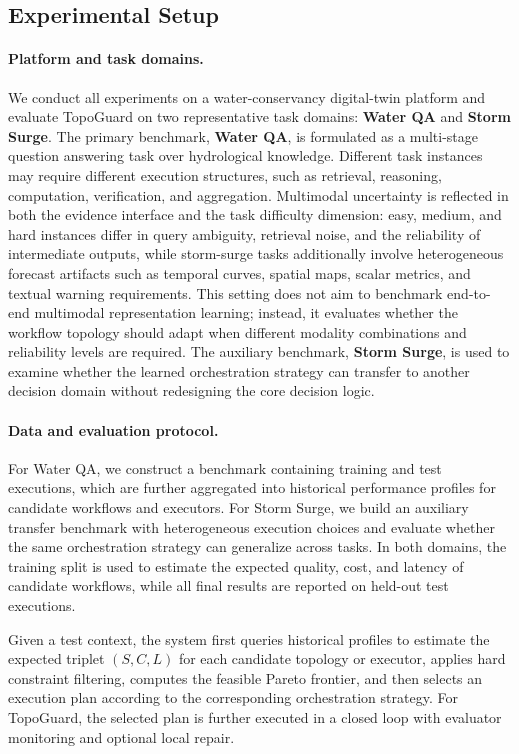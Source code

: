 \documentclass[manuscript,review,anonymous]{acmart}
\begin{document}
\subsection{Experimental Setup}
\label{subsec:exp_setup}



\paragraph{Platform and task domains.}
We conduct all experiments on a water-conservancy digital-twin platform and evaluate TopoGuard on two representative task domains: \textbf{Water QA} and \textbf{Storm Surge}. 
The primary benchmark, \textbf{Water QA}, is formulated as a multi-stage question answering task over hydrological knowledge. 
Different task instances may require different execution structures, such as retrieval, reasoning, computation, verification, and aggregation. 
Multimodal uncertainty is reflected in both the evidence interface and the task difficulty dimension: easy, medium, and hard instances differ in query ambiguity, retrieval noise, and the reliability of intermediate outputs, while storm-surge tasks additionally involve heterogeneous forecast artifacts such as temporal curves, spatial maps, scalar metrics, and textual warning requirements. This setting does not aim to benchmark end-to-end multimodal representation learning; instead, it evaluates whether the workflow topology should adapt when different modality combinations and reliability levels are required. The auxiliary benchmark, \textbf{Storm Surge}, is used to examine whether the learned orchestration strategy can transfer to another decision domain without redesigning the core decision logic.


\paragraph{Data and evaluation protocol.}
For Water QA, we construct a benchmark containing training and test executions, which are further aggregated into historical performance profiles for candidate workflows and executors. 
For Storm Surge, we build an auxiliary transfer benchmark with heterogeneous execution choices and evaluate whether the same orchestration strategy can generalize across tasks. 
In both domains, the training split is used to estimate the expected quality, cost, and latency of candidate workflows, while all final results are reported on held-out test executions.

Given a test context, the system first queries historical profiles to estimate the expected triplet $(S,C,L)$ for each candidate topology or executor, applies hard constraint filtering, computes the feasible Pareto frontier, and then selects an execution plan according to the corresponding orchestration strategy.
For TopoGuard, the selected plan is further executed in a closed loop with evaluator monitoring and optional local repair.
\end{document}
